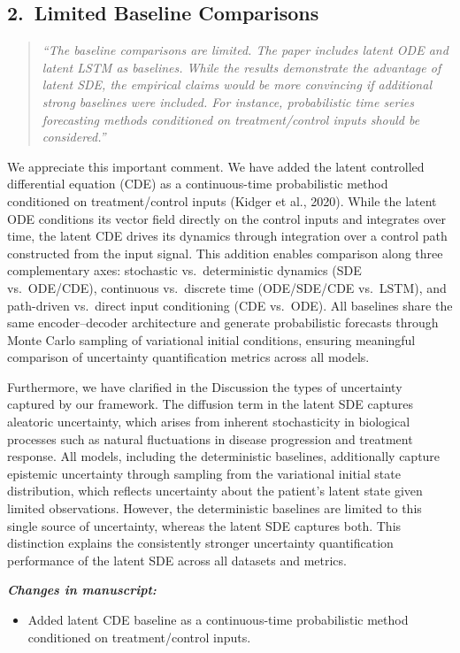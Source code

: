 \documentclass[12pt]{article}
\newcommand{\reviewercomment}[1]{%
  \begin{quote}
  \textcolor{reviewergray}{\textit{``#1''}}
  \end{quote}
}
\newcommand{\changes}{\vspace{0.3em}\noindent\textbf{\textit{Changes in manuscript:}}\vspace{0.2em}}
\begin{document}
\subsection*{2.\ Limited Baseline Comparisons}

\reviewercomment{The baseline comparisons are limited. The paper includes latent ODE and latent LSTM as baselines. While the results demonstrate the advantage of latent SDE, the empirical claims would be more convincing if additional strong baselines were included. For instance, probabilistic time series forecasting methods conditioned on treatment/control inputs should be considered.}

We appreciate this important comment. We have added the latent controlled differential equation (CDE) as a continuous-time probabilistic method conditioned on treatment/control inputs (Kidger et al., 2020). While the latent ODE conditions its vector field directly on the control inputs and integrates over time, the latent CDE drives its dynamics through integration over a control path constructed from the input signal. This addition enables comparison along three complementary axes: stochastic vs.\ deterministic dynamics (SDE vs.\ ODE/CDE), continuous vs.\ discrete time (ODE/SDE/CDE vs.\ LSTM), and path-driven vs.\ direct input conditioning (CDE vs.\ ODE). All baselines share the same encoder--decoder architecture and generate probabilistic forecasts through Monte Carlo sampling of variational initial conditions, ensuring meaningful comparison of uncertainty quantification metrics across all models. 

Furthermore, we have clarified in the Discussion the types of uncertainty captured by our framework. The diffusion term in the latent SDE captures aleatoric uncertainty, which arises from inherent stochasticity in biological processes such as natural fluctuations in disease progression and treatment response. All models, including the deterministic baselines, additionally capture epistemic uncertainty through sampling from the variational initial state distribution, which reflects uncertainty about the patient's latent state given limited observations. However, the deterministic baselines are limited to this single source of uncertainty, whereas the latent SDE captures both. This distinction explains the consistently stronger uncertainty quantification performance of the latent SDE across all datasets and metrics.

\changes
\begin{itemize}[leftmargin=2em]
\item Added latent CDE baseline as a continuous-time probabilistic method conditioned on treatment/control inputs.
\end{itemize}
\end{document}
